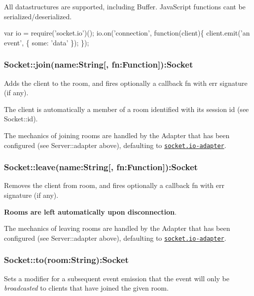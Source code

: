 All datastructures are supported, including {\ttfamily Buffer}. Java\+Script functions can\textquotesingle{}t be serialized/deserialized.


\begin{DoxyCode}
var io = require('socket.io')();
io.on('connection', function(client)\{
  client.emit('an event', \{ some: 'data' \});
\});
\end{DoxyCode}


\subsubsection*{Socket\+::join(name\+:\+String\mbox{[}, fn\+:\+Function\mbox{]})\+:Socket}

Adds the client to the {\ttfamily room}, and fires optionally a callback {\ttfamily fn} with {\ttfamily err} signature (if any).

The client is automatically a member of a room identified with its session id (see {\ttfamily Socket\+::id}).

The mechanics of joining rooms are handled by the {\ttfamily Adapter} that has been configured (see {\ttfamily Server\+::adapter} above), defaulting to \href{https://github.com/socketio/socket.io-adapter}{\tt socket.\+io-\/adapter}.

\subsubsection*{Socket\+::leave(name\+:\+String\mbox{[}, fn\+:\+Function\mbox{]})\+:Socket}

Removes the client from {\ttfamily room}, and fires optionally a callback {\ttfamily fn} with {\ttfamily err} signature (if any).

{\bfseries Rooms are left automatically upon disconnection}.

The mechanics of leaving rooms are handled by the {\ttfamily Adapter} that has been configured (see {\ttfamily Server\+::adapter} above), defaulting to \href{https://github.com/socketio/socket.io-adapter}{\tt socket.\+io-\/adapter}.

\subsubsection*{Socket\+::to(room\+:\+String)\+:Socket}

Sets a modifier for a subsequent event emission that the event will only be {\itshape broadcasted} to clients that have joined the given {\ttfamily room}.

